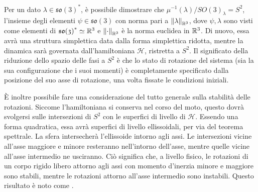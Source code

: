
Per un dato $\lambda \in \mathfrak{so(3)}^*$, è possibile dimostrare che $\mu^{-1}(\lambda)/SO(3)_{\lambda} = S^2$, l'insieme degli elementi $\psi \in \mathfrak{so(3)}$ con norma pari a $\norm{\lambda}_{\mathbb{R}^3}$, dove $\psi, \lambda$ sono visti come elementi di $\mathfrak{so(3)}^* \simeq \mathbb{R}^3$ e $\norm{\cdot}_{\mathbb{R}^3}$ è la norma euclidea in $\mathbb{R}^3$. Di nuovo, essa avrà una struttura simplettica data dalla forma simplettica ridotta, mentre la dinamica sarà governata dall'hamiltoniana $\mathcal{H}$, ristretta a $S^2$. Il significato della riduzione dello spazio delle fasi a $S^2$ è che lo stato di rotazione del sistema (sia la sua configurazione che i suoi momenti) è completamente specificato dalla posizione del suo asse di rotazione, una volta fissate le condizioni iniziali.

È inoltre possibile fare una considerazione del tutto generale sulla stabilità delle rotazioni. Siccome l'hamiltoniana si conserva nel corso del moto, questo dovrà svolgersi sulle intersezioni di $S^2$ con le superfici di livello di $\mathcal{H}$. Essendo una forma quadratica, essa avrà superfici di livello ellissoidali, per via del teorema spettrale. La sfera intersecherà l'ellissoide intorno agli assi. Le intersezioni vicine all'asse maggiore e minore resteranno nell'intorno dell'asse, mentre quelle vicine all'asse intermedio ne usciranno. Ciò significa che, a livello fisico, le rotazioni di un corpo rigido libero attorno agli assi con momento d'inerzia minore e maggiore sono stabili, mentre le rotazioni attorno all'asse intermedio sono instabili. Questo risultato è noto come .